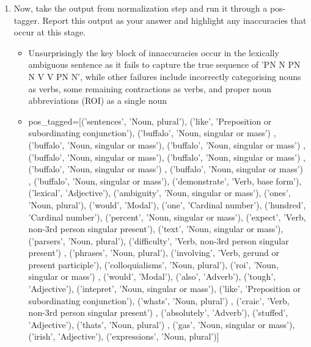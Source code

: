 \documentclass{scrreprt}
\begin{document}
\begin{enumerate}
\item Now, take the output from normalization step and run it through a pos-tagger. Report this output as your answer and highlight any inaccuracies that occur at this stage.
	\begin{itemize}\label{POS}
		\item Unsurprisingly the key block of innaccuracies occur in the lexically ambiguous sentence as it fails to capture the true sequence of 'PN N PN N V V PN N', while other failures include incorrectly categorising nouns as verbs, some remaining contractions as verbs, and proper noun abbreviations (ROI) as a single noun
		\item pos\_tagged=[('sentences', 'Noun, plural'),
		('like', 'Preposition or subordinating conjunction'),
		\color{red}('buffalo', 'Noun, singular or mass')	\color{black},
		('buffalo', 'Noun, singular or mass'),
		\color{red}('buffalo', 'Noun, singular or mass')	\color{black},
		('buffalo', 'Noun, singular or mass'),
			\color{red}('buffalo', 'Noun, singular or mass')	\color{black},
			\color{red}('buffalo', 'Noun, singular or mass')	\color{black},
			\color{red}('buffalo', 'Noun, singular or mass')	\color{black},
		('buffalo', 'Noun, singular or mass'),
		('demonstrate', 'Verb, base form'),
		('lexical', 'Adjective'),
		('ambiguity', 'Noun, singular or mass'),
		('ones', 'Noun, plural'),
		('would', 'Modal'),
		('one', 'Cardinal number'),
		('hundred', 'Cardinal number'),
		('percent', 'Noun, singular or mass'),
		('expect', 'Verb, non-3rd person singular present'),
		('text', 'Noun, singular or mass'),
		('parsers', 'Noun, plural'),
			\color{red}('difficulty', 'Verb, non-3rd person singular present')	\color{black},
		('phrases', 'Noun, plural'),
		('involving', 'Verb, gerund or present participle'),
		('colloquialisms', 'Noun, plural'),
			\color{red}('roi', 'Noun, singular or mass')	\color{black},
		('would', 'Modal'),
		('also', 'Adverb'),
		('tough', 'Adjective'),
		('intepret', 'Noun, singular or mass'),
		('like', 'Preposition or subordinating conjunction'),
			\color{red}('whats', 'Noun, plural')	\color{black},
			\color{red}('craic', 'Verb, non-3rd person singular present')	\color{black},
		('absolutely', 'Adverb'),
		('stuffed', 'Adjective'),
			\color{red}('thats', 'Noun, plural')	\color{black},
		('gas', 'Noun, singular or mass'),
		('irish', 'Adjective'),
		('expressions', 'Noun, plural')]
	\end{itemize}
\end{enumerate}
\end{document}
